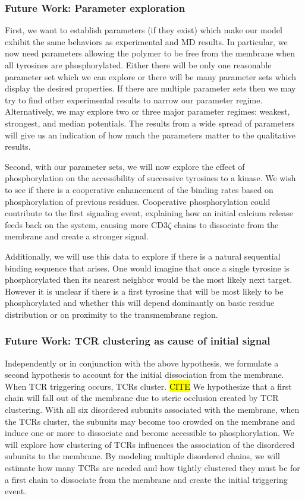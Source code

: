\documentclass[../../AdvancementSummary.tex]{subfiles}
\begin{document}
\subsubsection{Future Work: Parameter exploration}

First, we want to establish parameters (if they exist) which make our model exhibit the same behaviors as experimental and MD results. In particular, we now need parameters allowing the polymer to be free from the membrane when all tyrosines are phosphorylated. Either there will be only one reasonable parameter set which we can explore or there will be many parameter sets which display the desired properties.  If there are multiple parameter sets then we may try to find other experimental results to narrow our parameter regime. Alternatively, we may explore two or three major parameter regimes: weakest, strongest, and median potentials. The results from a wide spread of parameters will give us an indication of how much the parameters matter to the qualitative results.  

Second, with our parameter sets, we will now explore the effect of phosphorylation on the accessibility of successive tyrosines to a kinase.  We wish to see if there is a cooperative enhancement of the binding rates based on phosphorylation of previous residues.  Cooperative phosphorylation could contribute to the first signaling event, explaining how an initial calcium release feeds back on the system, causing more CD3$\zeta$ chains to dissociate from the membrane and create a stronger signal. \cite{Shi2013}

Additionally, we will use this data to explore if there is a natural sequential binding sequence that arises.  One would imagine that once a single tyrosine is phosphorylated then its nearest neighbor would be the most likely next target.  However it is unclear if there is a first tyrosine that will be most likely to be phosphorylated and whether this will depend dominantly on basic residue distribution or on proximity to the transmembrane region. 

\subsubsection{Future Work: TCR clustering as cause of initial signal}
Independently or in conjunction with the above hypothesis, we formulate a second hypothesis to account for the initial dissociation from the membrane. When TCR triggering occurs, TCRs cluster. \hl{CITE} We hypothesize that a first chain will fall out of the membrane due to steric occlusion created by TCR clustering. With all six disordered subunits associated with the membrane, when the TCRs cluster, the subunits may become too crowded on the membrane and induce one or more to dissociate and become accessible to phosphorylation. We will explore how clustering of TCRs influences the association of the disordered subunits to the membrane. By modeling multiple disordered chains, we will estimate how many TCRs are needed and how tightly clustered they must be for a first chain to dissociate from the membrane and create the initial triggering event.
\end{document}
